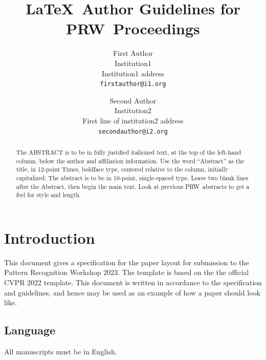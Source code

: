 \documentclass[10pt,twocolumn,letterpaper]{article}
\def\confName{PRW}
\begin{document}
\title{\LaTeX\ Author Guidelines for \confName~Proceedings}

\author{First Author\\
Institution1\\
Institution1 address\\
{\tt\small firstauthor@i1.org}
\and
Second Author\\
Institution2\\
First line of institution2 address\\
{\tt\small secondauthor@i2.org}
}
\maketitle


\begin{abstract}
The ABSTRACT is to be in fully justified italicized text, at the top of the left-hand column, below the author and affiliation information. Use the word ``Abstract'' as the title, in 12-point Times, boldface type, centered relative to the column, initially capitalized. The abstract is to be in 10-point, single-spaced type. Leave two blank lines after the Abstract, then begin the main text. Look at previous \confName\ abstracts to get a feel for style and length.
\end{abstract}


\section{Introduction}
\label{sec:intro}

This document gives a specification for the paper layout for submission to the Pattern Recognition Workshop 2023. The template is based on the the official CVPR 2022 template. This document is written in accordance to the specification and guidelines, and hence may be used as an example of how a paper should look like. 

\subsection{Language}

All manuscripts must be in English.
\end{document}
